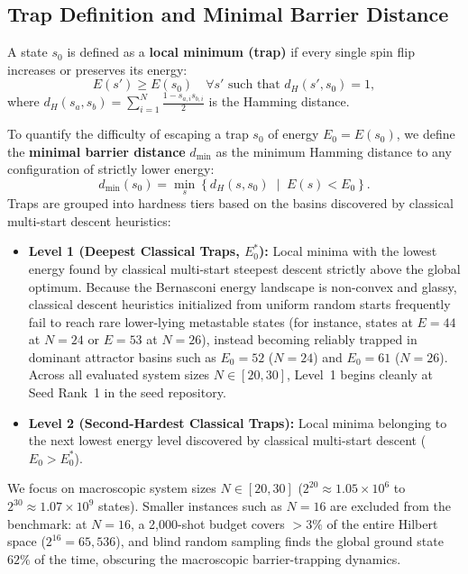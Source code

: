 \documentclass[10pt,twocolumn,a4paper]{article}
\begin{document}
\subsection{Trap Definition and Minimal Barrier Distance}
A state $s_0$ is defined as a \textbf{local minimum (trap)} if every single spin flip increases or preserves its energy:
\begin{equation}
    E(s') \ge E(s_0) \quad \forall s' \text{ such that } d_H(s', s_0) = 1,
\end{equation}
where $d_H(s_a, s_b) = \sum_{i=1}^N \frac{1 - s_{a,i} s_{b,i}}{2}$ is the Hamming distance.

To quantify the difficulty of escaping a trap $s_0$ of energy $E_0 = E(s_0)$, we define the \textbf{minimal barrier distance} $d_{\min}$ as the minimum Hamming distance to any configuration of strictly lower energy:
\begin{equation}
    d_{\min}(s_0) = \min_{s} \left\{ d_H(s, s_0) \;\middle|\; E(s) < E_0 \right\}.
    \label{eq:d_min}
\end{equation}
Traps are grouped into hardness tiers based on the basins discovered by classical multi-start descent heuristics:
\begin{itemize}
    \item \textbf{Level 1 (Deepest Classical Traps, $E_0^*$):} Local minima with the lowest energy found by classical multi-start steepest descent strictly above the global optimum. Because the Bernasconi energy landscape is non-convex and glassy, classical descent heuristics initialized from uniform random starts frequently fail to reach rare lower-lying metastable states (for instance, states at $E = 44$ at $N = 24$ or $E = 53$ at $N = 26$), instead becoming reliably trapped in dominant attractor basins such as $E_0 = 52$ ($N=24$) and $E_0 = 61$ ($N=26$). Across all evaluated system sizes $N \in [20, 30]$, Level~1 begins cleanly at Seed Rank~1 in the seed repository.
    \item \textbf{Level 2 (Second-Hardest Classical Traps):} Local minima belonging to the next lowest energy level discovered by classical multi-start descent ($E_0 > E_0^*$).
\end{itemize}

We focus on macroscopic system sizes $N \in [20, 30]$ ($2^{20} \approx 1.05 \times 10^6$ to $2^{30} \approx 1.07 \times 10^9$ states). Smaller instances such as $N = 16$ are excluded from the benchmark: at $N = 16$, a 2,000-shot budget covers $>3\%$ of the entire Hilbert space ($2^{16} = 65{,}536$), and blind random sampling finds the global ground state $62\%$ of the time, obscuring the macroscopic barrier-trapping dynamics.
\end{document}
